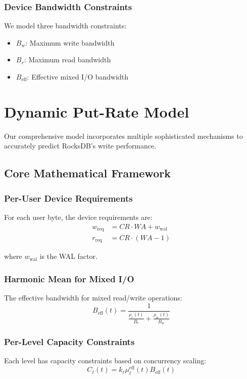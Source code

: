 \documentclass[11pt,twocolumn]{article}
\newcommand{\mueff}{\mu^{\text{eff}}}
\begin{document}
\subsubsection{Device Bandwidth Constraints}
We model three bandwidth constraints:
\begin{itemize}
    \item $B_w$: Maximum write bandwidth
    \item $B_r$: Maximum read bandwidth  
    \item $B_{\text{eff}}$: Effective mixed I/O bandwidth
\end{itemize}

\section{Dynamic Put-Rate Model}

Our comprehensive model incorporates multiple sophisticated mechanisms to accurately predict RocksDB's write performance.

\subsection{Core Mathematical Framework}

\subsubsection{Per-User Device Requirements}
For each user byte, the device requirements are:
\begin{align}
w_{\text{req}} &= CR \cdot WA + w_{\text{wal}} \\
r_{\text{req}} &= CR \cdot (WA - 1)
\end{align}

where $w_{\text{wal}}$ is the WAL factor.

\subsubsection{Harmonic Mean for Mixed I/O}
The effective bandwidth for mixed read/write operations:
\begin{equation}
B_{\text{eff}}(t) = \frac{1}{\frac{\rho_r(t)}{B_r} + \frac{\rho_w(t)}{B_w}}
\end{equation}

\subsubsection{Per-Level Capacity Constraints}
Each level has capacity constraints based on concurrency scaling:
\begin{equation}
C_\ell(t) = k_\ell \mueff_\ell(t) B_{\text{eff}}(t)
\end{equation}
\end{document}

